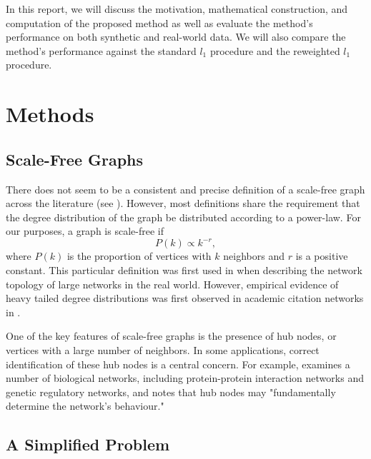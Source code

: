 \documentclass{uwstat572}
\theoremstyle{remark}
\theoremstyle{definition}
\begin{document}
In this report, we will discuss the motivation, mathematical construction, and computation of the proposed method as well as evaluate the method's performance on both synthetic and real-world data.  We will also compare the method's performance against the standard $l_1$ procedure and the reweighted $l_1$ procedure.  

\section{Methods}

\subsection{Scale-Free Graphs}

There does not seem to be a consistent and precise definition of a scale-free graph across the literature (see \cite{li2005}).  However, most definitions share the requirement that the degree distribution of the graph be distributed according to a power-law. For our purposes, a graph is scale-free if 
\begin{equation}\label{powerlaw}
P(k) \propto k^{-r},
\end{equation}
where $P(k)$ is the proportion of vertices with $k$ neighbors and $r$ is a positive constant.  This particular definition was first used in \cite{Barabasi99} when describing the network topology of large networks in the real world.  However, empirical evidence of heavy tailed degree distributions was first observed in academic citation networks in \cite{de1965networks}.

One of the key features of scale-free graphs is the presence of hub nodes, or vertices with a large number of neighbors.  In some applications, correct identification of these hub nodes is a central concern.  For example, \cite{barabasi2004network} examines a number of biological networks, including protein-protein interaction networks and genetic regulatory networks, and notes that hub nodes may "fundamentally determine the network's behaviour."



\subsection{A Simplified Problem}
\end{document}
